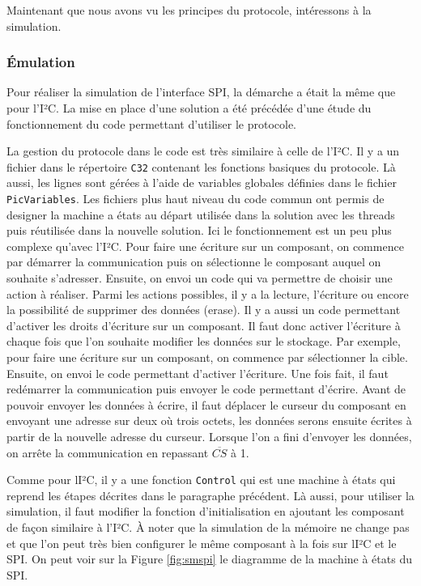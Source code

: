 \documentclass[a4paper]{article}
\begin{document}
Maintenant que nous avons vu les principes du protocole, intéressons à la
simulation.

\subsubsection*{Émulation}

Pour réaliser la simulation de l'interface SPI, la démarche a était la même que
pour l'I²C. La mise en place d'une solution a été précédée d'une étude du
fonctionnement du code permettant d'utiliser le protocole.

La gestion du protocole dans le code est très similaire à celle de l'I²C. Il y a
un fichier dans le répertoire \verb|C32| contenant les fonctions basiques
du protocole. Là aussi, les lignes sont gérées à l'aide de variables globales
définies dans le fichier \verb|PicVariables|. Les fichiers plus haut niveau
du code commun ont permis de designer la machine a états au départ utilisée dans
la solution avec les threads puis réutilisée dans la nouvelle solution. Ici le
fonctionnement est un peu plus complexe qu'avec l'I²C. Pour faire une écriture
sur un composant, on commence par démarrer la communication puis on sélectionne
le composant auquel on souhaite s'adresser. Ensuite, on envoi un code qui va
permettre de choisir une action à réaliser. Parmi les actions possibles, il y a
la lecture, l'écriture ou encore la possibilité de supprimer des données
(erase). Il y a aussi un code permettant d'activer les droits d'écriture sur un
composant. Il faut donc activer l'écriture à chaque fois que l'on souhaite
modifier les données sur le stockage. Par exemple, pour faire une écriture sur
un composant, on commence par sélectionner la cible. Ensuite, on envoi le code
permettant d'activer l'écriture. Une fois fait, il faut redémarrer la
communication puis envoyer le code permettant d'écrire. Avant de pouvoir envoyer
les données à écrire, il faut déplacer le curseur du composant en envoyant une
adresse sur deux où trois octets, les données serons ensuite écrites à partir de
la nouvelle adresse du curseur. Lorsque l'on a fini d'envoyer les données, on
arrête la communication en repassant $\overline{CS}$ à 1.

Comme pour lI²C, il y a une fonction \verb|Control| qui est une machine à états
qui reprend les étapes décrites dans le paragraphe précédent. Là aussi, pour
utiliser la simulation, il faut modifier la fonction d'initialisation en
ajoutant les composant de façon similaire à l'I²C. À noter que la simulation de
la mémoire ne change pas et que l'on peut très bien configurer le même composant
à la fois sur lI²C et le SPI. On peut voir sur la Figure \ref{fig:smspi} le
diagramme de la machine à états du SPI.
\end{document}
